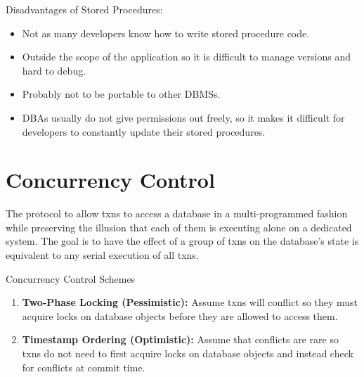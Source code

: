 \documentclass[11pt]{article}
\begin{document}
Disadvantages of Stored Procedures:
\begin{itemize}
    \item
    Not as many developers know how to write stored procedure code.
    
    \item
    Outside the scope of the application so it is difficult to manage versions and hard to 
    debug.
    
    \item
    Probably not to be portable to other DBMSs.
    
    \item
    DBAs usually do not give permissions out freely, so it makes it difficult for developers to 
    constantly update their stored procedures.
\end{itemize}

\section{Concurrency Control}
The protocol to allow txns to access a database in a multi-programmed fashion while preserving 
the illusion that each of them is executing alone on a dedicated system.
The goal is to have the effect of a group of txns on the database's state is equivalent to any 
serial execution of all txns.
    
Concurrency Control Schemes
\begin{enumerate}
    \item \textbf{Two-Phase Locking (Pessimistic):}
    Assume txns will conflict so they must acquire locks on database objects before they are 
    allowed to access them.
    
    \item \textbf{Timestamp Ordering (Optimistic):}
    Assume that conflicts are rare so txns do not need to first acquire locks on database objects 
    and instead check for conflicts at commit time.
\end{enumerate}

%     
\end{document}
